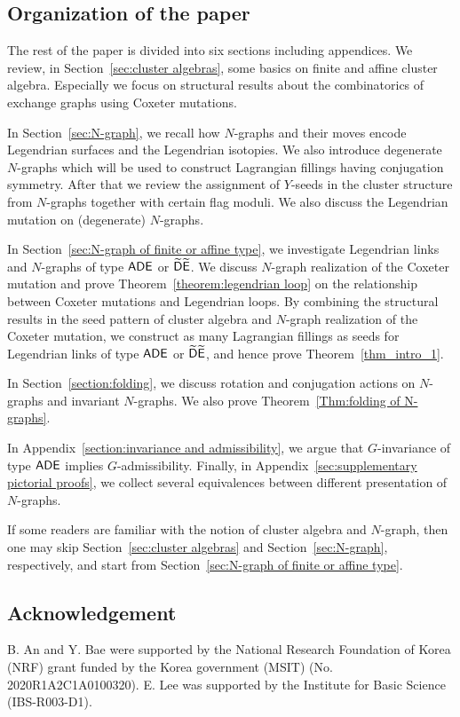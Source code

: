 \subsection{Organization of the paper}
The rest of the paper is divided into six sections including appendices. 
We review, in Section~\ref{sec:cluster algebras}, some basics on finite and affine cluster algebra. Especially we focus on structural results about the combinatorics of exchange graphs using Coxeter mutations.

In Section~\ref{sec:N-graph}, we recall how $N$-graphs and their moves encode Legendrian surfaces and the Legendrian isotopies. We also introduce degenerate $N$-graphs which will be used to construct Lagrangian fillings having conjugation symmetry. 
After that we review the assignment of $Y$-seeds in the cluster structure from $N$-graphs together with certain flag moduli. We also discuss the Legendrian mutation on (degenerate) $N$-graphs.

In Section~\ref{sec:N-graph of finite or affine type}, we investigate Legendrian links and $N$-graphs of type $\mathsf{ADE}$ or $\widetilde{\mathsf{D}} \widetilde{\mathsf{E}}$. 
We discuss $N$-graph realization of the Coxeter mutation and prove Theorem~\ref{theorem:legendrian loop} on the relationship between Coxeter mutations and Legendrian loops.
By combining the structural results in the seed pattern of cluster algebra and $N$-graph realization of the Coxeter mutation, we construct as many Lagrangian fillings as seeds for Legendrian links of type $\mathsf{ADE}$ or $\widetilde{\mathsf{D}} \widetilde{\mathsf{E}}$, and hence prove Theorem~\ref{thm_intro_1}.

In Section~\ref{section:folding}, we discuss rotation and conjugation actions on $N$-graphs and invariant $N$-graphs. We also prove Theorem~\ref{Thm:folding of N-graphs}.

In Appendix~\ref{section:invariance and admissibility}, 
we argue that $G$-invariance of type $\mathsf{ADE}$ implies $G$-admissibility. 
Finally, in Appendix~\ref{sec:supplementary pictorial proofs}, we collect several equivalences between different presentation of $N$-graphs.

If some readers are familiar with the notion of cluster algebra and $N$-graph, then one may skip Section~\ref{sec:cluster algebras} and Section~\ref{sec:N-graph}, respectively, and start from Section~\ref{sec:N-graph of finite or affine type}.


\subsection*{Acknowledgement}
B. An and Y. Bae were supported by the National Research Foundation of Korea (NRF) grant funded by the Korea government (MSIT) (No. 2020R1A2C1A0100320).
E. Lee was supported by the Institute for Basic Science (IBS-R003-D1).

